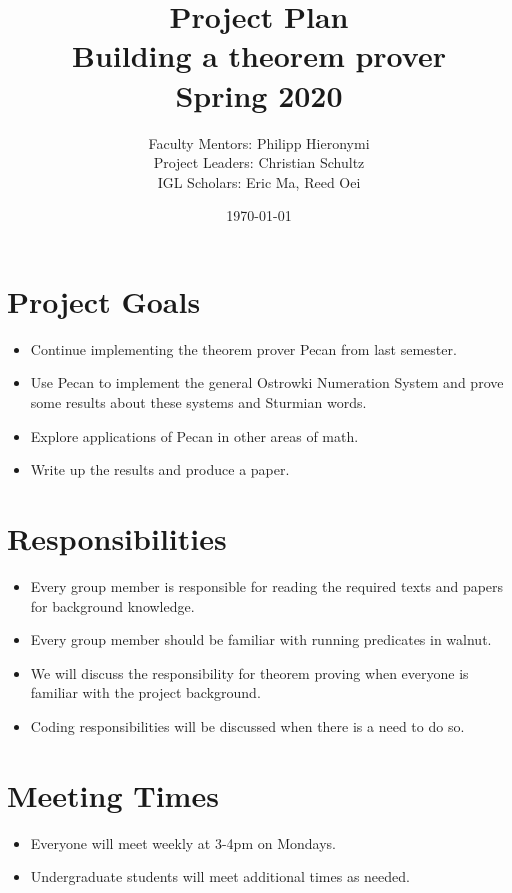 \documentclass[12pt]{article}
\begin{document}
\title{Project Plan\\ {Building a theorem prover} \\Spring 2020}
\author{Faculty Mentors: {Philipp Hieronymi} \\
	Project Leaders: {Christian Schultz}\\
	IGL Scholars: { Eric Ma, Reed Oei }}
\date{\today}
\maketitle
\section{Project Goals}
\begin{itemize} 
\item Continue implementing the theorem prover Pecan from last semester.
\item Use Pecan to implement the general Ostrowki Numeration System and prove some results about these systems and Sturmian words.
\item Explore applications of Pecan in other areas of math.
\item Write up the results and produce a paper. 
\end{itemize}

\section{Responsibilities}
\begin{itemize}
\item Every group member is responsible for reading the required texts and papers for background knowledge.
\item Every group member should be familiar with running predicates in walnut. 
\item We will discuss the responsibility for theorem proving when everyone is familiar with the project background.
\item Coding responsibilities will be discussed when there is a need to do so. 
\end{itemize}

\section{Meeting Times}
\begin{itemize}
	\item Everyone will meet weekly at 3-4pm on Mondays.
	\item Undergraduate students will meet additional times as needed.
\end{itemize}
\end{document}
